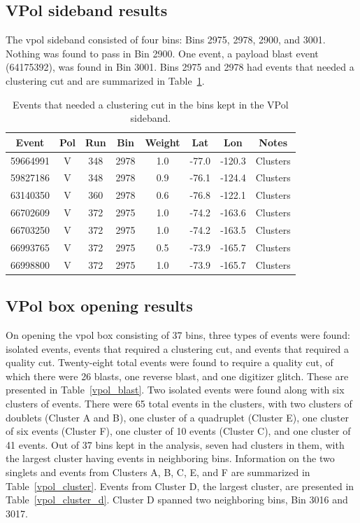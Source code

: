 \subsection{VPol sideband results}

The \gls{vpol} sideband consisted of four bins: Bins 2975, 2978, 2900, and 3001. Nothing was found to pass in Bin 2900. One event, a payload blast event (64175392), was found in Bin 3001. Bins 2975 and 2978 had events that needed a clustering cut and are summarized in Table~\ref{sideband}.

\begin{table}
\centering
\begin{tabular}{ |c|c|c|c|c|c|c|c| } 
\hline
Event & Pol & Run & Bin & Weight & Lat & Lon & Notes \\
\hline
59664991 & V & 348 & 2978 & 1.0 & -77.0 & -120.3 & Clusters\\
59827186 & V & 348 & 2978 & 0.9 & -76.1 & -124.4 & Clusters\\
63140350 & V & 360 & 2978 & 0.6 & -76.8 & -122.1 & Clusters\\
66702609 & V & 372 & 2975 & 1.0 & -74.2 & -163.6 & Clusters\\
66703250 & V & 372 & 2975 & 1.0 & -74.2 & -163.5 & Clusters\\
66993765 & V & 372 & 2975 & 0.5 & -73.9 & -165.7 & Clusters\\
66998800 & V & 372 & 2975 & 1.0 & -73.9 & -165.7 & Clusters\\
\hline
\end{tabular}
\caption{Events that needed a clustering cut in the bins kept in the VPol sideband.}
\label{sideband}
\end{table}


\subsection{VPol box opening results}

On opening the \gls{vpol} box consisting of 37 bins, three types of events were found: isolated events, events that required a clustering cut, and events that required a quality cut. Twenty-eight total events were found to require a quality cut, of which there were 26 blasts, one reverse blast, and one digitizer glitch. These are presented in Table~\ref{vpol_blast}. Two isolated events were found along with six clusters of events. There were 65 total events in the clusters, with two clusters of doublets (Cluster A and B), one cluster of a quadruplet (Cluster E), one cluster of six events (Cluster F), one cluster of 10 events (Cluster C), and one cluster of 41 events. 
Out of 37 bins kept in the analysis, seven had clusters in them, with the largest cluster having events in neighboring bins. Information on the two singlets and events from Clusters A, B, C, E, and F are summarized in Table~\ref{vpol_cluster}. Events from Cluster D, the largest cluster, are presented in Table~\ref{vpol_cluster_d}. Cluster D spanned two neighboring bins, Bin 3016 and 3017. 

